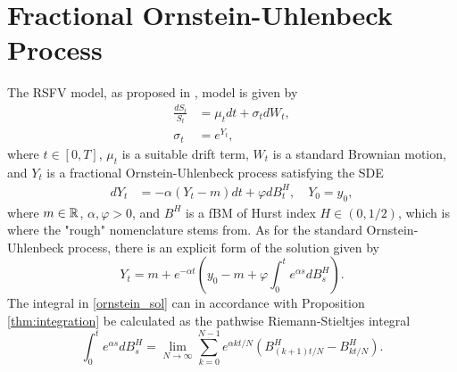 \section{Fractional Ornstein-Uhlenbeck Process}
The RSFV model, as proposed in \cite{volisrough}, model is given by
\begin{align}
    \frac{dS_{t}}{S_{t}}&= \mu_{t}dt + \sigma_{t}dW_{t},\\
    \sigma_{t}&= e^{Y_{t}},
\end{align}
where $t\in [0,T]$, $\mu_{t}$ is a suitable drift term, $W_{t}$ is a standard Brownian motion, and $Y_{t}$ is a fractional Ornstein-Uhlenbeck process satisfying the SDE
\begin{align}
    dY_{t}&= -\alpha(Y_{t}-m)dt + \varphi dB^{H}_{t},\quad Y_{0}=y_{0},
\end{align}
where $m \in \mathbb{R}$, $\alpha,\varphi >0$, and $B^{H}$ is a fBM of Hurst index $H\in(0,1/2)$, which is where the "rough" nomenclature stems from. As for the standard Ornstein-Uhlenbeck process, there is an explicit form of the solution given by
\begin{equation}\label{ornstein_sol}
    Y_{t}= m + e^{-\alpha t}\left(y_{0}-m+\varphi\int_{0}^{t}e^{\alpha s}dB_{s}^{H}\right).
\end{equation}
The integral in \eqref{ornstein_sol} can in accordance with Proposition \ref{thm:integration} be calculated as the pathwise Riemann-Stieltjes integral
\begin{equation}\label{eq:riemann}
    \int_{0}^{t}e^{\alpha s}dB_{s}^{H}=\lim_{N\to\infty}\sum_{k=0}^{N-1}e^{\alpha k t/N}\left(B_{(k+1)t/N}^{H}-B_{kt/N}^{H}\right).
\end{equation}
